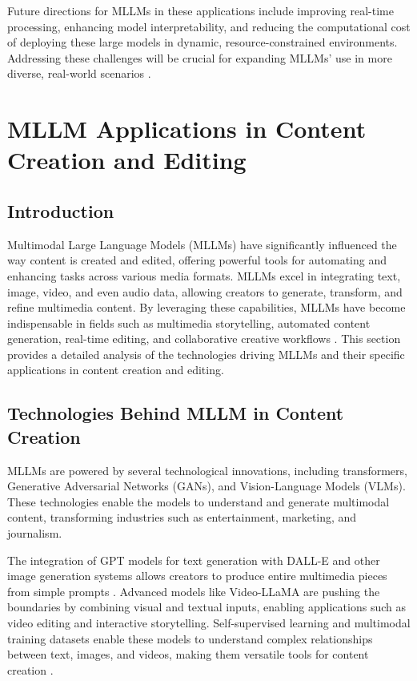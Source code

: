 Future directions for MLLMs in these applications include improving real-time processing, enhancing model interpretability, and reducing the computational cost of deploying these large models in dynamic, resource-constrained environments. Addressing these challenges will be crucial for expanding MLLMs' use in more diverse, real-world scenarios \cite{vs2024yang,vs2023chen}.

\section{MLLM Applications in Content Creation and Editing}

\subsection{Introduction}

Multimodal Large Language Models (MLLMs) have significantly influenced the way content is created and edited, offering powerful tools for automating and enhancing tasks across various media formats. MLLMs excel in integrating text, image, video, and even audio data, allowing creators to generate, transform, and refine multimedia content. By leveraging these capabilities, MLLMs have become indispensable in fields such as multimedia storytelling, automated content generation, real-time editing, and collaborative creative workflows \cite{vs2024chang,vs2017lauer}. This section provides a detailed analysis of the technologies driving MLLMs and their specific applications in content creation and editing.

\subsection{Technologies Behind MLLM in Content Creation}

MLLMs are powered by several technological innovations, including transformers, Generative Adversarial Networks (GANs), and Vision-Language Models (VLMs). These technologies enable the models to understand and generate multimodal content, transforming industries such as entertainment, marketing, and journalism. 

The integration of GPT models for text generation with DALL-E and other image generation systems allows creators to produce entire multimedia pieces from simple prompts \cite{vs2024chang}. Advanced models like Video-LLaMA are pushing the boundaries by combining visual and textual inputs, enabling applications such as video editing and interactive storytelling. Self-supervised learning and multimodal training datasets enable these models to understand complex relationships between text, images, and videos, making them versatile tools for content creation \cite{vs2024song}.

